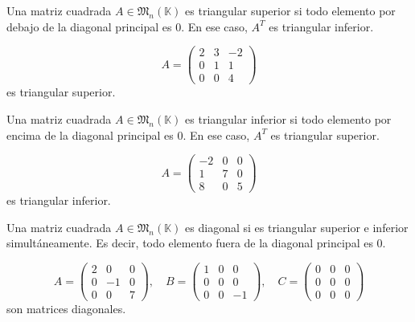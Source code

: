\documentclass[a4paper,12pt]{article}
\begin{document}
\begin{procedimiento}[title=Matriz triangular superior]
Una matriz cuadrada $A \in \mathfrak{M}_n(\mathbb{K})$ es triangular superior si todo elemento por debajo de la diagonal principal es $0$.  
En ese caso, $A^T$ es triangular inferior.
\end{procedimiento}

\begin{ejemplo}[title=Ejemplo de matriz triangular superior]
\[
A=
\begin{pmatrix}
2 & 3 & -2 \\
0 & 1 & 1 \\
0 & 0 & 4
\end{pmatrix}
\]
es triangular superior.
\end{ejemplo}



\begin{procedimiento}[title=Matriz triangular inferior]
Una matriz cuadrada $A \in \mathfrak{M}_n(\mathbb{K})$ es triangular inferior si todo elemento por encima de la diagonal principal es $0$.  
En ese caso, $A^T$ es triangular superior.
\end{procedimiento}

\begin{ejemplo}[title=Ejemplo de matriz triangular inferior]
\[
A=
\begin{pmatrix}
-2 & 0 & 0 \\
1 & 7 & 0 \\
8 & 0 & 5
\end{pmatrix}
\]
es triangular inferior.
\end{ejemplo}



\begin{procedimiento}[title=Matriz diagonal]
Una matriz cuadrada $A \in \mathfrak{M}_n(\mathbb{K})$ es diagonal si es triangular superior e inferior simultáneamente.  
Es decir, todo elemento fuera de la diagonal principal es $0$.
\end{procedimiento}

\begin{ejemplo}[title=Ejemplos de matrices diagonales]
\[
A=
\begin{pmatrix}
2 & 0 & 0 \\
0 & -1 & 0 \\
0 & 0 & 7
\end{pmatrix},
\quad
B=
\begin{pmatrix}
1 & 0 & 0 \\
0 & 0 & 0 \\
0 & 0 & -1
\end{pmatrix},
\quad
C=
\begin{pmatrix}
0 & 0 & 0 \\
0 & 0 & 0 \\
0 & 0 & 0
\end{pmatrix}
\]
son matrices diagonales.
\end{ejemplo}
\end{document}
